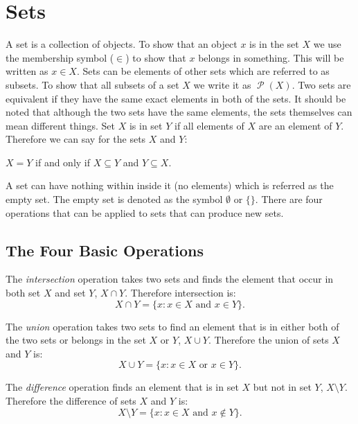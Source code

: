 \documentclass[11pt,a4paper, notitlepage]{report}
\DeclareMathOperator{\power}{\mathcal{P}}
\begin{document}
\section{Sets}
\label{sec:sets}

A set is a collection of objects. To show that an object $x$ is in the set $X$ we use the membership symbol ($\in$) to show that $x$ belongs in something. This will be written as $x \in X$. Sets can be elements of other sets which are referred to as subsets. To show that all subsets of a set $X$ we write it as $\power(X)$. Two sets are equivalent if they have the same exact elements in both of the sets. It should be noted that although the two sets have the same elements, the sets themselves can mean different things. Set $X$ is in set $Y$ if all elements of $X$ are an element of $Y$.
Therefore we can say for the sets $X$ and $Y$:
\begin{center}
  $X=Y$ if and only if $X \subseteq Y$ and $Y \subseteq X$.
\end{center}
A set can have nothing within inside it (no elements) which is referred as the empty set. The empty set is denoted as the symbol $\emptyset$ or $\{\}$. There are four operations that can be applied to sets that can produce new sets.

\subsection{The Four Basic Operations}
\label{sec:fourbasop}

The \emph{intersection} operation takes two sets and finds the element that occur in both set $X$ and set $Y$, $X \cap Y$. Therefore intersection is:
\begin{displaymath}
  X \cap Y = \{x : x \in X  \text{ and } x \in Y\}.
\end{displaymath}

The \emph{union} operation takes two sets to find an element that is in either both of the two sets or belongs in the set $X$ or $Y$, $X \cup Y$. Therefore the union of sets $X$ and $Y$ is:
\begin{displaymath}
  X \cup Y = \{x : x \in X  \text{ or } x \in Y\}.
\end{displaymath}

The \emph{difference} operation finds an element that is in set $X$ but not in set $Y$, $X \setminus Y$. Therefore the difference of sets $X$ and $Y$ is:
\begin{displaymath}
  X \setminus Y = \{x : x \in X  \text{ and } x \notin Y\}.
\end{displaymath}
\end{document}
